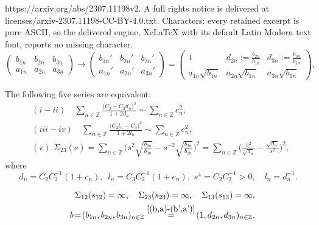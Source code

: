 \documentclass[10pt,a4paper]{amsart}
\begin{document}
https://arxiv.org/abs/2307.11198v2. A full rights notice is delivered at licenses/arxiv-2307.11198-CC-BY-4.0.txt. Characters: every retained excerpt is pure ASCII, so the delivered engine, XeLaTeX with its default Latin Modern text font, reports no missing character.
\begin{equation}
 \label{(b,a)-(b',a')}
\left(\begin{smallmatrix}
b_{1n}&b_{2n}&b_{3n}\\
a_{1n}&a_{2n}&a_{3n}
\end{smallmatrix}
\right)\to
\left(\begin{smallmatrix}
b_{1n}'&b_{2n}'&b_{3n}'\\
a_{1n}'&a_{2n}'&a_{3n}'
\end{smallmatrix}
\right)=
%
\left(\begin{smallmatrix}
1&d_{2n}:=\frac{b_{2n}}{b_{1n}}&d_{3n}:=\frac{b_{3n}}{b_{1n}}\\
a_{1n}\sqrt{b_{1n}}&a_{2n}\sqrt{b_{1n}}&a_{3n}\sqrt{b_{1n}}
\end{smallmatrix}
\right),
\end{equation}

\begin{lem}
\label{l.light.123} 
The following five series are equivalent:
%
\begin{eqnarray}
\label{rho(2)}
&&(i-ii)\quad \sum_{n\in \mathbb Z}\frac{\big(C_2\!-\!C_3d_{n}\big)^2}{1+2d_n}\sim \sum_{n\in \mathbb Z}c_n^2,\\
\label{rho(3)}
&&(iii-iv)\quad\sum_{n\in \mathbb Z}\frac{\big(C_2l_n\!-\!C_3\big)^2}{1+2l_n}\sim \sum_{n\in \mathbb Z}e_n^2,\\
\label{sigma(23)(s)}
&&(v)\,\,\Sigma_{23}(s)\!=
\!
\sum_{n\in \mathbb Z}\Big(
s^2\sqrt{\frac{b_{2n}}{b_{3n}}}\!-\!
s^{-2}\sqrt{\frac{b_{3n}}{b_{2n}}}\Big)^2\!=
\!\sum_{n\in \mathbb Z}\Big(
\frac{s^2}{\sqrt{d_n}}\!-\!
\frac{\sqrt{d_n}}{s^2}\Big)^2
,\quad
\end{eqnarray}
where 
\begin{equation}
\label{c_n,e_n}
d_n\!=\!
C_2C_3^{-1}(1+c_n),\,\,\,l_n\!=\!C_3C_2^{-1}(1+e_n),\,\,s^4\!=\!C_2C_3^{-1}>0,\quad l_n\!=\!d_n^{-1}.
\end{equation}
\end{lem}

\begin{eqnarray}
\label{Sigma(123)=(111)}
&&
\Sigma_{12}(s_{12})=\infty,\quad \Sigma_{23}(s_{23})=\infty,\quad\Sigma_{13}(s_{13})=\infty,\\
\nonumber
&&
  b\!=\!(b_{1n},b_{2n},b_{3n})_{n\in \mathbb Z}\stackrel{ \eqref{(b,a)-(b',a')}}{=}\!(1,d_{2n},d_{3n})_{n\in \mathbb Z}.
\end{eqnarray}
\end{document}
